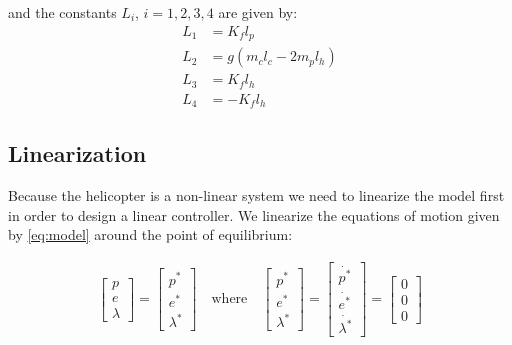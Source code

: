 and the constants $L_i$, $i = {1, 2, 3, 4}$ are given by:
\begin{subequations}\label{const:L}
    \begin{align}
        L_{1} &= K_{f} l_{p} \label{const:L_1} \\
        L_{2} &= g (m_{c} l_{c} - 2 m_{p} l_{h} ) \label{const:L_2} \\
        L_{3} &= K_{f} l_{h} \label{const:L_3} \\
        L_{4} &= -K_{f} l_{h} \label{const:L_4}
    \end{align}
\end{subequations}


\subsection{Linearization}

Because the helicopter is a non-linear system we need to linearize the model first in order to design a linear controller. We linearize the equations of motion given by \cref{eq:model} around the point of equilibrium:

\begin{equation}\label{eq:lin_equilibrium}
    \begin{aligned}
        \begin{bmatrix} p \\ e \\ \lambda \end{bmatrix}
        =
        \begin{bmatrix} p^* \\ e^* \\ \lambda^* \end{bmatrix}
        \quad \textrm{where} \quad
        \begin{bmatrix} p^* \\ e^* \\ \lambda^* \end{bmatrix}
        =
       \begin{bmatrix} \dot{p^*} \\ \dot{e^*} \\ \dot{\lambda^*} \end{bmatrix}
        = 
        \begin{bmatrix} 0 \\ 0 \\ 0 \end{bmatrix} \\
    \end{aligned}
\end{equation}

